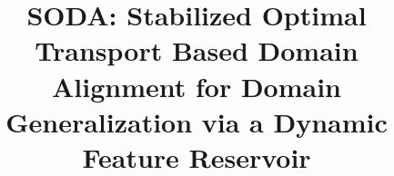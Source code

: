 \documentclass[preprint,12pt]{elsarticle}%
\begin{document}
\begin{frontmatter}



\title{SODA: Stabilized Optimal Transport Based Domain Alignment for Domain Generalization via a Dynamic Feature Reservoir}











\end{frontmatter}
\end{document}
